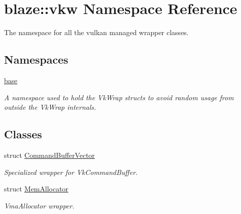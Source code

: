 \hypertarget{namespaceblaze_1_1vkw}{}\section{blaze\+:\+:vkw Namespace Reference}
\label{namespaceblaze_1_1vkw}


The namespace for all the vulkan managed wrapper classes.  


\subsection*{Namespaces}
\begin{DoxyCompactItemize}
\item 
 \hyperlink{namespaceblaze_1_1vkw_1_1base}{base}
\begin{DoxyCompactList}\small\item\em A namespace used to hold the Vk\+Wrap structs to avoid random usage from outside the Vk\+Wrap internals. \end{DoxyCompactList}\end{DoxyCompactItemize}
\subsection*{Classes}
\begin{DoxyCompactItemize}
\item 
struct \hyperlink{structblaze_1_1vkw_1_1CommandBufferVector}{Command\+Buffer\+Vector}
\begin{DoxyCompactList}\small\item\em Specialized wrapper for Vk\+Command\+Buffer. \end{DoxyCompactList}\item 
struct \hyperlink{structblaze_1_1vkw_1_1MemAllocator}{Mem\+Allocator}
\begin{DoxyCompactList}\small\item\em Vma\+Allocator wrapper. \end{DoxyCompactList}\end{DoxyCompactItemize}
